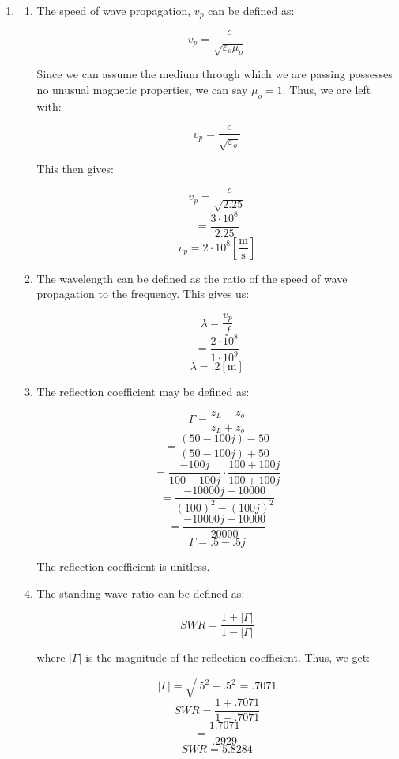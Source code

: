 \begin{enumerate}

  \item 

    \begin{enumerate}

      \item 

        The speed of wave propagation, $v_p$ can be defined as:

        $$v_p=\frac{c}{\sqrt{\varepsilon_o\mu_o}}$$

        Since we can assume the medium through which we are passing possesses no unusual magnetic properties, we can say $\mu_o=1$. Thus, we are left with:

        $$v_p=\frac{c}{\sqrt{\varepsilon_o}}$$

        This then gives:
        
        $$v_p=\frac{c}{\sqrt{2.25}}$$
        $$=\frac{3\cdot10^8}{2.25}$$
        $$\boxed{v_p=2\cdot10^8\left[ \frac{\si{\meter}}{\si{\second}} \right]}$$

      \item 

        The wavelength can be defined as the ratio of the speed of wave propagation to the frequency. This gives us:

        $$\lambda=\frac{v_p}{f}$$
        $$=\frac{2\cdot10^{8}}{1\cdot10^9}$$
        $$\boxed{\lambda=.2[\si{\meter}]}$$

      \item 

        The reflection coefficient may be defined as:

        $$\Gamma=\frac{z_L-z_o}{z_L+z_o}$$
        $$=\frac{(50-100j)-50}{(50-100j)+50}$$
        $$=\frac{-100j}{100-100j}\cdot\frac{100+100j}{100+100j}$$
        $$=\frac{-10000j+10000}{(100)^2-(100j)^2}$$
        $$=\frac{-10000j+10000}{20000}$$
        $$\boxed{\Gamma=.5-.5j}$$

        The reflection coefficient is unitless.

      \item 

        The standing wave ratio can be defined as:

        $$SWR=\frac{1+|\Gamma|}{1-|\Gamma|}$$

        where $|\Gamma|$ is the magnitude of the reflection coefficient. Thus, we get:

        $$|\Gamma|=\sqrt{.5^2+.5^2}=.7071$$
        $$SWR=\frac{1+.7071}{1-.7071}$$
        $$=\frac{1.7071}{.2929}$$
        $$\boxed{SWR=5.8284}$$


\end{enumerate}
\end{enumerate}
